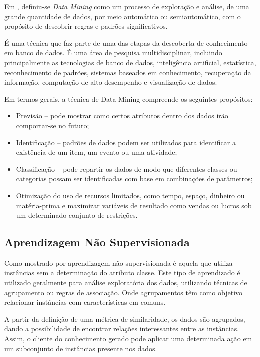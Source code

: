 \documentclass[
	12pt,				%
	openright,			%
	oneside,	
	a4paper,				%
	english,				%
	brazil				%
]{abntex2/abntex2} %
\begin{document}
		Em \cite{berry:1997}, definiu-se \textit{Data Mining} como um processo de exploração e análise, de uma grande quantidade de dados, por meio automático ou semiautomático, com o propósito de descobrir regras e padrões significativos.
		
		É uma técnica que faz parte de uma das etapas da descoberta de conhecimento em banco de dados. É uma área de pesquisa multidisciplinar, incluindo principalmente as tecnologias de banco de dados, inteligência artificial, estatística, reconhecimento de padrões, sistemas baseados em conhecimento, recuperação da informação, computação de alto desempenho e visualização de dados.
		
		Em termos gerais, a técnica de Data Mining compreende os seguintes propósitos:
		
		\begin{itemize}
			\item Previsão – pode mostrar como certos atributos dentro dos dados irão comportar-se no futuro;
			\item Identificação – padrões de dados podem ser utilizados para identificar a existência de um item, um evento ou uma atividade;
			\item Classificação – pode repartir os dados de modo que diferentes classes ou categorias possam ser identificadas com base em combinações de parâmetros;
			\item Otimização do uso de recursos limitados, como tempo, espaço, dinheiro ou matéria-prima e maximizar variáveis de resultado como vendas ou lucros sob um determinado conjunto de restrições.
		\end{itemize}
		
	\subsection{Aprendizagem Não Supervisionada}
	
		Como mostrado por \cite{damasceno:2005} aprendizagem não supervisionada é aquela que utiliza instâncias sem a determinação do atributo classe. Este  tipo de aprendizado é utilizado geralmente para análise exploratória dos dados, utilizando técnicas de  agrupamento ou regras de associação. Onde agrupamentos têm como objetivo relacionar instâncias com características em comuns.
		
		A partir da definição de uma métrica de similaridade, os dados são  agrupados, dando a possibilidade de encontrar relações interessantes entre as instâncias. Assim, o cliente do conhecimento gerado pode aplicar uma determinada ação em um subconjunto de instâncias presente nos  dados. 
		
\end{document}
